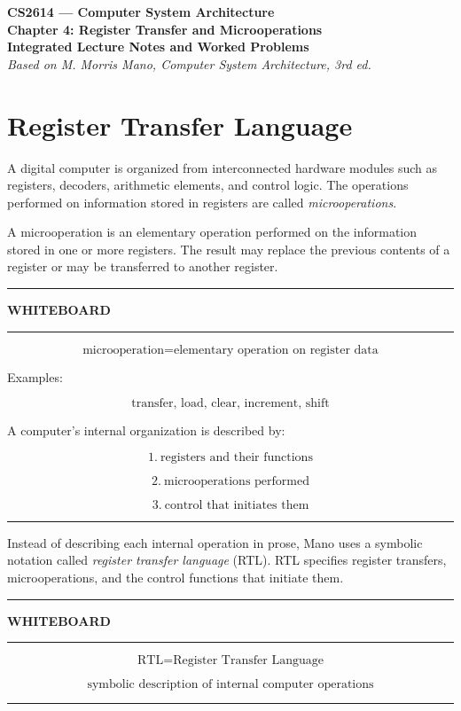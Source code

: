 \documentclass[11pt]{article}
\newenvironment{whiteboard}
{
    \par\medskip
    \hrule
    \vspace{0.35em}
    \noindent\textbf{\large WHITEBOARD}
    \par\vspace{0.3em}
    \hrule
    \vspace{0.65em}
}
{
    \vspace{0.45em}
    \hrule
    \par\medskip
}
\begin{document}
\begin{center}
    {\LARGE\textbf{CS2614 --- Computer System Architecture}}\\[0.45em]
    {\Large\textbf{Chapter 4: Register Transfer and Microoperations}}\\[0.25em]
    {\large\textbf{Integrated Lecture Notes and Worked Problems}}\\[0.45em]
    \textit{Based on M. Morris Mano, Computer System Architecture, 3rd ed.}
\end{center}

\section{Register Transfer Language}

A digital computer is organized from interconnected hardware modules such as registers, decoders, arithmetic elements, and control logic. The operations performed on information stored in registers are called \emph{microoperations}.

A microoperation is an elementary operation performed on the information stored in one or more registers. The result may replace the previous contents of a register or may be transferred to another register.

\begin{whiteboard}

\[
\boxed{\text{microoperation}=\text{elementary operation on register data}}
\]

Examples:

\[
\boxed{\text{transfer, load, clear, increment, shift}}
\]

A computer's internal organization is described by:

\[
\boxed{1.\ \text{registers and their functions}}
\]

\[
\boxed{2.\ \text{microoperations performed}}
\]

\[
\boxed{3.\ \text{control that initiates them}}
\]

\end{whiteboard}

Instead of describing each internal operation in prose, Mano uses a symbolic notation called \emph{register transfer language} (RTL). RTL specifies register transfers, microoperations, and the control functions that initiate them.

\begin{whiteboard}

\[
\boxed{\text{RTL}=\text{Register Transfer Language}}
\]

\[
\boxed{\text{symbolic description of internal computer operations}}
\]

\end{whiteboard}
\end{document}
